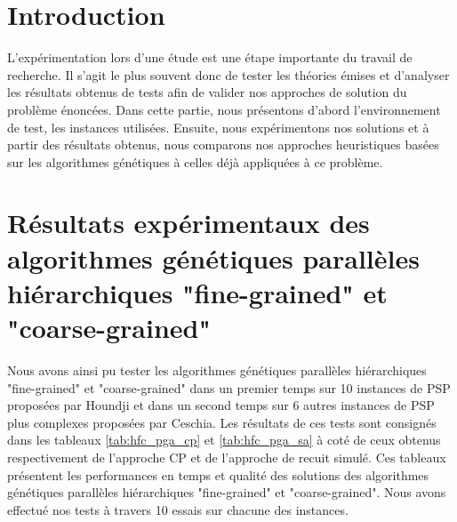 \section*{Introduction}
		L'expérimentation lors d'une étude est une étape importante du travail de recherche. Il s'agit le plus souvent donc de tester les théories émises et d'analyser les résultats obtenus de tests afin de valider nos approches de solution du problème énoncées. Dans cette partie, nous présentons d'abord l'environnement de test, les instances utilisées. Ensuite, nous expérimentons nos solutions et à partir des résultats obtenus, nous comparons nos approches heuristiques basées sur les algorithmes génétiques à celles déjà appliquées à ce problème.
		
		\section{Résultats expérimentaux des algorithmes génétiques parallèles hiérarchiques "fine-grained" et "coarse-grained"}
		Nous avons ainsi pu tester les algorithmes génétiques parallèles hiérarchiques "fine-grained" et "coarse-grained" dans un premier temps sur 10 instances de PSP proposées par Houndji et dans un second temps sur 6 autres instances de PSP plus complexes proposées par Ceschia. Les résultats de ces tests sont consignés dans les tableaux \ref{tab:hfc_pga_cp} et \ref{tab:hfc_pga_sa} à coté de ceux obtenus respectivement de l'approche CP et de l'approche de recuit simulé. Ces tableaux présentent les performances en temps et qualité des solutions des algorithmes génétiques parallèles hiérarchiques "fine-grained" et "coarse-grained". Nous avons effectué nos tests à travers 10 essais sur chacune des instances.
		

